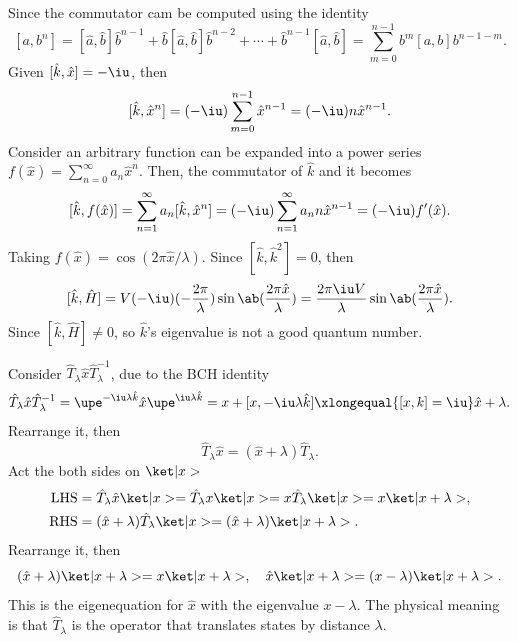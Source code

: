 \begin{solution}\leavevmode
  \begin{enumext}
    \item Since the commutator cam be computed using the identity
    \[
      [a, b^n] = [\hat a, \hat b]\hat b^{n-1}
                + \hat b[\hat a, \hat b]\hat b^{n-2} + \cdots
                + \hat b^{n-1}[\hat a, \hat b]
    = \sum_{m=0}^{n-1} b^m [a, b] b^{n-1-m}.
    \]
    Given $[\hat k, \hat x] = -\iu$, then
    \[
      [\hat k, \hat x^n] = (-\iu) \sum_{m=0}^{n-1} \hat x^{n-1}
    = (-\iu) n \hat x^{n-1}.
    \]
    Consider an arbitrary function can be expanded into a power series
    $f(\hat x) = \sum_{n=0}^\infty a_n \hat x^n$.
    Then, the commutator of $\hat k$ and it becomes
    \[
      [\hat k, f(\hat x)] = \sum_{n=1}^\infty a_n [\hat k, \hat x^n]
    = (-\iu) \sum_{n=1}^\infty a_n n \hat x^{n-1}
    = (-\iu) f'(\hat x).
    \]
    Taking $f(\hat x) = \cos(2\pi\hat x/\lambda)$.
    Since $[\hat k, \hat k^2] = 0$, then
    \[
      [\hat k, \hat H]
    = V (-\iu) (-\frac{2\pi}{\lambda}) \sin\ab(\frac{2\pi\hat x}{\lambda})
    = \frac{2\pi\iu V}{\lambda} \sin\ab(\frac{2\pi\hat x}{\lambda}).
    \]
    Since $[\hat k, \hat H] \neq 0$, so $\hat k$'s eigenvalue is not a good
    quantum number.
    \item Consider $\hat T_\lambda \hat x \hat T_\lambda^{-1}$, due to the
    BCH identity
    \[
      \hat T_\lambda \hat x \hat T_\lambda^{-1}
    = \upe^{-\iu\lambda\hat k} \hat x \upe^{\iu\lambda\hat k}
    = x + [x, -\iu\lambda \hat k] \xlongequal{[x, k] = \iu} \hat x + \lambda.
    \]
    Rearrange it, then
    \[
      \hat T_\lambda \hat x = (\hat x + \lambda) \hat T_\lambda.
    \]
    Act the both sides on $\ket|x>$
    \begin{align*}
      \text{LHS} & = \hat T_\lambda \hat x \ket|x> = \hat T_\lambda x \ket|x>
    = x \hat T_\lambda \ket|x> = x \ket|x + \lambda>,\\
      \text{RHS} & = (\hat x + \lambda) \hat T_\lambda \ket|x>
    = (\hat x + \lambda) \ket|x + \lambda>.
    \end{align*}
    Rearrange it, then
    \[
      (\hat x + \lambda) \ket|x + \lambda> = x\ket|x + \lambda>, \quad
      \hat x \ket|x + \lambda> = (x - \lambda) \ket|x + \lambda>.
    \]
    This is the eigenequation for $\hat x$ with the eigenvalue $x - \lambda$.
    The physical meaning is that $\hat T_\lambda$ is the
    operator that translates states by distance $\lambda$.


\end{enumext}
\end{solution}
